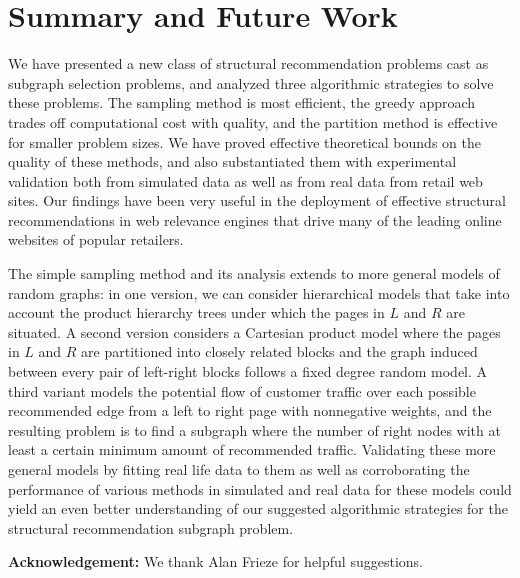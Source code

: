 \section{Summary and Future Work}
We have presented a new class of structural recommendation problems
cast as subgraph selection problems, and analyzed three algorithmic
strategies to solve these problems. The sampling method is most
efficient, the greedy approach trades off computational cost with
quality, and the partition method is effective for smaller problem
sizes. We have proved effective theoretical bounds on the quality
of these methods, and also substantiated them with experimental
validation both from simulated data as well as from real data from
retail web sites. Our findings have been very useful in the
deployment of effective structural recommendations in web relevance
engines that drive many of the leading online websites of popular
retailers.

The simple sampling method and its analysis extends to more general
models of random graphs: in one version, we can consider
hierarchical models that take into account the product hierarchy
trees under which the pages in $L$ and $R$ are situated. A second
version considers a Cartesian product model where the pages in $L$
and $R$ are partitioned into closely related blocks and the graph
induced between every pair of left-right blocks follows a fixed
degree random model. A third variant models the potential flow of
customer traffic over each possible recommended edge from a left to
right page with nonnegative weights, and the resulting problem is
to find a subgraph where the number of right nodes with at least a
certain minimum amount of recommended traffic. Validating these
more general models by fitting real life data to them as well as
corroborating the performance of various methods in simulated and
real data for these models could yield an even better understanding
of our suggested algorithmic strategies for the structural
recommendation subgraph problem.\vs

{\bf Acknowledgement:} We thank Alan Frieze for helpful
suggestions.
